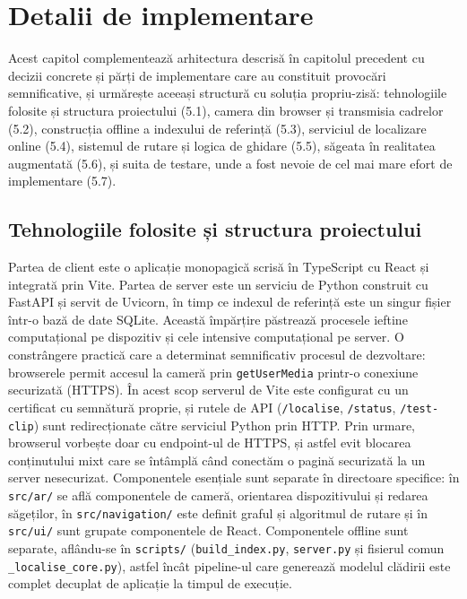 \chapter{Detalii de implementare}
Acest capitol complementează arhitectura descrisă în capitolul precedent cu decizii concrete și părți de implementare care au constituit provocări semnificative, și urmărește aceeași structură cu soluția propriu-zisă: tehnologiile folosite și structura proiectului (5.1), camera din browser și transmisia cadrelor (5.2), construcția offline a indexului de referință (5.3), serviciul de localizare online (5.4), sistemul de rutare și logica de ghidare (5.5), săgeata în realitatea augmentată (5.6), și suita de testare, unde a fost nevoie de cel mai mare efort de implementare (5.7).
\section{Tehnologiile folosite și structura proiectului}
Partea de client este o aplicație monopagică scrisă în TypeScript cu React și integrată prin Vite. Partea de server este un serviciu de Python construit cu FastAPI și servit de Uvicorn, în timp ce indexul de referință este un singur fișier într-o bază de date SQLite. Această împărțire păstrează procesele ieftine computațional pe dispozitiv și cele intensive computațional pe server.
O constrângere practică care a determinat semnificativ procesul de dezvoltare: browserele permit accesul la cameră prin \texttt{getUserMedia} printr-o conexiune securizată (HTTPS). În acest scop serverul de Vite este configurat cu un certificat cu semnătură proprie, și rutele de API (\texttt{/localise}, \texttt{/status}, \texttt{/test-clip}) sunt redirecționate către serviciul Python prin HTTP. Prin urmare, browserul vorbește doar cu endpoint-ul de HTTPS, și astfel evit blocarea conținutului mixt care se întâmplă când conectăm o pagină securizată la un server nesecurizat.
Componentele esențiale sunt separate în directoare specifice: în \texttt{src/ar/} se află componentele de cameră, orientarea dispozitivului și redarea săgeților, în \texttt{src/navigation/} este definit graful și algoritmul de rutare și în \texttt{src/ui/} sunt grupate componentele de React. Componentele offline sunt separate, aflându-se în \texttt{scripts/} (\texttt{build\_index.py}, \texttt{server.py} și fisierul comun \texttt{\_localise\_core.py}), astfel încât pipeline-ul care generează modelul clădirii este complet decuplat de aplicație la timpul de execuție.
